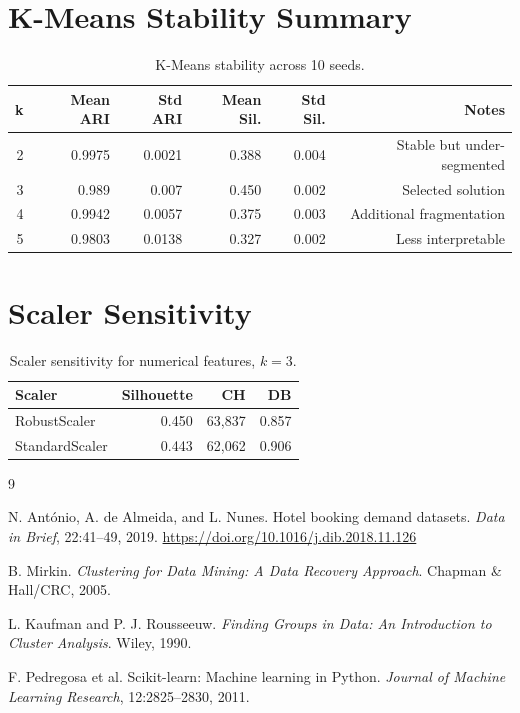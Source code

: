 \documentclass[11pt,a4paper]{article}
\begin{document}
\section{K-Means Stability Summary}
\begin{table}[H]
\centering
\caption{K-Means stability across 10 seeds.}
\begin{tabular}{rrrrrr}
\toprule
\textbf{k} & \textbf{Mean ARI} & \textbf{Std ARI} & \textbf{Mean Sil.} & \textbf{Std Sil.} & \textbf{Notes} \\
\midrule
2 & 0.9975 & 0.0021 & 0.388 & 0.004 & Stable but under-segmented \\
3 & 0.989 & 0.007 & 0.450 & 0.002 & Selected solution \\
4 & 0.9942 & 0.0057 & 0.375 & 0.003 & Additional fragmentation \\
5 & 0.9803 & 0.0138 & 0.327 & 0.002 & Less interpretable \\
\bottomrule
\end{tabular}
\end{table}

\section{Scaler Sensitivity}
\begin{table}[H]
\centering
\caption{Scaler sensitivity for numerical features, $k=3$.}
\begin{tabular}{lrrr}
\toprule
\textbf{Scaler} & \textbf{Silhouette} & \textbf{CH} & \textbf{DB} \\
\midrule
RobustScaler & 0.450 & 63,837 & 0.857 \\
StandardScaler & 0.443 & 62,062 & 0.906 \\
\bottomrule
\end{tabular}
\end{table}

\begin{thebibliography}{9}

N. António, A. de Almeida, and L. Nunes.
\newblock Hotel booking demand datasets.
\newblock \emph{Data in Brief}, 22:41--49, 2019.
\newblock \url{https://doi.org/10.1016/j.dib.2018.11.126}

B. Mirkin.
\newblock \emph{Clustering for Data Mining: A Data Recovery Approach}.
\newblock Chapman \& Hall/CRC, 2005.

L. Kaufman and P. J. Rousseeuw.
\newblock \emph{Finding Groups in Data: An Introduction to Cluster Analysis}.
\newblock Wiley, 1990.

F. Pedregosa et al.
\newblock Scikit-learn: Machine learning in Python.
\newblock \emph{Journal of Machine Learning Research}, 12:2825--2830, 2011.

\end{thebibliography}
\end{document}

